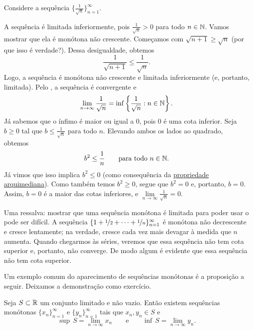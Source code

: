 \begin{example}
Considere a sequência $\bigl\{ \frac{1}{\sqrt{n}} \bigr\}_{n=1}^\infty$.

A sequência é limitada inferiormente, pois
$\frac{1}{\sqrt{n}} > 0$ para todo $n \in {\mathbb{N}}$.
Vamos mostrar que ela é monótona não crescente. Começamos com
$\sqrt{n+1} \geq \sqrt{n}$ (por que isso é verdade?). Dessa desigualdade,
obtemos
\begin{equation*}
\frac{1}{\sqrt{n+1}} \leq \frac{1}{\sqrt{n}} .
\end{equation*}
Logo, a sequência é monótona não crescente e limitada inferiormente (e,
portanto, limitada). Pelo , a sequência é
convergente e
\begin{equation*}
\lim_{n\to \infty} \frac{1}{\sqrt{n}}
=
\inf \left\{ \frac{1}{\sqrt{n}} : n \in {\mathbb{N}} \right\} .
\end{equation*}
Já sabemos que o ínfimo é maior ou igual a 0, pois 0 é uma cota inferior.
Seja $b \geq 0$ tal que $b \leq \frac{1}{\sqrt{n}}$ para todo $n$.
Elevando ambos os lados ao quadrado, obtemos
\begin{equation*}
b^2 \leq \frac{1}{n} \qquad \text{para todo } n \in {\mathbb{N}}.
\end{equation*}
Já vimos que isso implica $b^2 \leq 0$ (como consequência da
\hyperref[thm:arch:i]{propriedade arquimediana}). Como também temos
$b^2 \geq 0$, segue que $b^2 = 0$ e, portanto, $b = 0$.
Assim, $b=0$ é a maior das cotas inferiores, e
$\lim\limits_{n\to\infty} \frac{1}{\sqrt{n}} = 0$.
\end{example}

\begin{example}
Uma ressalva: mostrar que uma sequência monótona é limitada para poder usar
o  pode ser difícil.
A sequência
$\{ 1 + \nicefrac{1}{2} + \cdots + \nicefrac{1}{n} \}_{n=1}^\infty$
é monótona não decrescente e cresce lentamente; na verdade, cresce cada vez
mais devagar à medida que $n$ aumenta. Quando chegarmos às séries, veremos
que essa sequência não tem cota superior e, portanto, não converge. De modo
algum é evidente que essa sequência não tem cota superior.
\end{example}

Um exemplo comum do aparecimento de sequências monótonas é a proposição a
seguir. Deixamos a demonstração como exercício.

\begin{prop} \label{prop:supinfseq}
Seja $S \subset {\mathbb{R}}$ um conjunto limitado e não vazio.
Então existem sequências monótonas $\{ x_n \}_{n=1}^\infty$ e
$\{ y_n \}_{n=1}^\infty$ tais que $x_n, y_n \in S$ e
\begin{equation*}
\sup\,S = \lim_{n\to \infty} x_n \qquad \text{e} \qquad \inf\,S =
\lim_{n\to\infty} y_n .
\end{equation*}
\end{prop}

